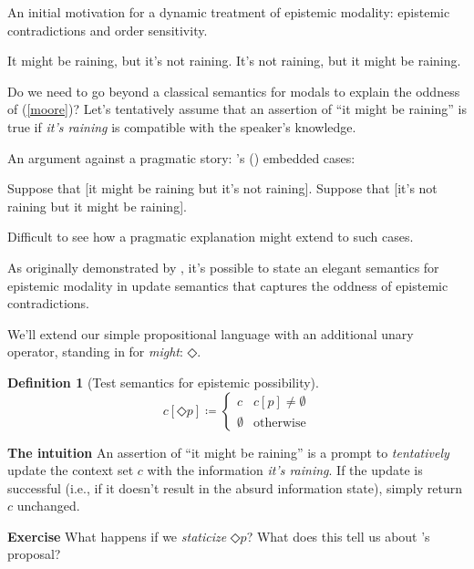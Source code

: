 \documentclass[nols,twoside,nofonts,nobib,nohyper]{tufte-handout}
\theoremstyle{definition}
\newtheorem{definition}{Definition}[section]
\begin{document}
An initial motivation for a dynamic treatment of epistemic modality: epistemic contradictions and order sensitivity.

\pex\label{moore}
\a{}It might be raining, but it's not raining.\label{moore1}
\a\ljudge{\#}It's not raining, but it might be raining.\label{moore2}
\xe

Do we need to go beyond a classical semantics for modals to explain the oddness of (\ref{moore})? Let's tentatively assume that an assertion of \enquote{it might be raining} is true if \textit{it's raining} is compatible with the speaker's knowledge.

An argument against a pragmatic story: \citeauthor{Yalcin2007}'s (\citeyear{Yalcin2007}) embedded cases:

\pex
\a{}Suppose that [it might be raining but it's not raining].
\a{}Suppose that [it's not raining but it might be raining].
\xe

Difficult to see how a pragmatic explanation might extend to such cases.

As originally demonstrated by \citet{Veltman1996}, it's possible to state an elegant semantics for epistemic modality in update semantics that captures the oddness of epistemic contradictions.

We'll extend our simple propositional language with an additional unary operator, standing in for \textit{might}: $◇$.

\begin{definition}[Test semantics for epistemic possibility]
  $$
  c[◇ p] ≔ \begin{cases}
    c&c[p] ≠ ∅\\
    ∅&\text{otherwise}
    \end{cases}
  $$
\end{definition}

\begin{tcolorbox}
  \textbf{The intuition}
  \tcblower
  An assertion of \enquote{it might be raining} is a prompt to \textit{tentatively} update the context set $c$ with the information \textit{it's raining}. If the update is successful (i.e., if it doesn't result in the absurd information state), simply return $c$ unchanged.
\end{tcolorbox}

\begin{tcolorbox}
  \textbf{Exercise}
  \tcblower
  What happens if we \textit{staticize} $◇ p$? What does this tell us about \citeauthor{Veltman1996}'s proposal?
\end{tcolorbox}
\end{document}
